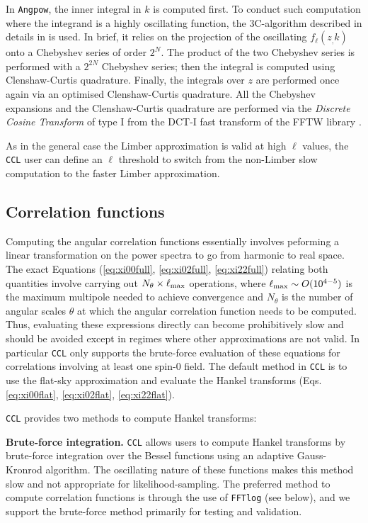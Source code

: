 \documentclass[\docopts]{\docclass}
\newcommand{\ccl}{{\tt CCL}\xspace}
\begin{document}
In \texttt{Angpow}, the inner integral in $k$ is computed first.
To conduct such computation where the integrand is a highly oscillating function, the 3C-algorithm described in details in \citet{2017A&A...602A..72C} is used. In brief, it relies on the projection of the oscillating $f_\ell(z_,k)$ onto a Chebyshev series of order $2^N$. The product of the two Chebyshev series is performed with a $2^{2N}$ Chebyshev series; then the integral is computed using Clenshaw-Curtis quadrature. Finally, the integrals over $z$ are performed once again via an optimised Clenshaw-Curtis quadrature. All the Chebyshev expansions and the Clenshaw-Curtis quadrature are performed via the \textit{Discrete Cosine Transform} of type I from the DCT-I fast transform of the FFTW library \citep{FFTW}.

As in the general case the Limber approximation is valid at high $\ell$ values, the \ccl user can define an $\ell$ threshold to switch from the non-Limber slow computation to the faster Limber approximation.
 


\subsection{Correlation functions}

Computing the angular correlation functions essentially involves peforming a linear transformation on the power spectra to go from harmonic to real space. The exact Equations (\ref{eq:xi00full}, \ref{eq:xi02full}, \ref{eq:xi22full}) relating both quantities involve carrying out $N_\theta\times\ell_{\rm max}$ operations, where $\ell_{\rm max}\sim O(10^{4-5})$ is the maximum multipole needed to achieve convergence and $N_\theta$ is the number of angular scales $\theta$ at which the angular correlation function needs to be computed. Thus, evaluating these expressions directly can become prohibitively slow and should be avoided except in regimes where other approximations are not valid. In particular \ccl only supports the brute-force evaluation of these equations for correlations involving at least one spin-0 field. The default method in \ccl is to use the flat-sky approximation and evaluate the Hankel transforms (Eqs. \ref{eq:xi00flat}, \ref{eq:xi02flat}, \ref{eq:xi22flat}).

\ccl provides two methods to compute Hankel transforms:

{\bf Brute-force integration.} \ccl allows users to compute Hankel transforms by brute-force integration over the Bessel functions using an adaptive Gauss-Kronrod algorithm. The oscillating nature of these functions makes this method slow and not appropriate for likelihood-sampling. The preferred method to compute correlation functions is through the use of {\tt FFTlog} (see below), and we support the brute-force method primarily for testing and validation.
\end{document}
